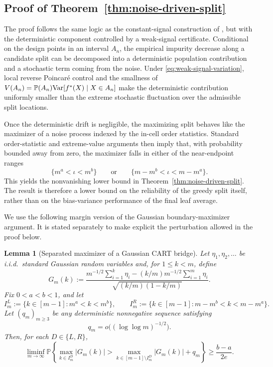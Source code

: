 \documentclass[11pt]{article}
\theoremstyle{plain}
\newtheorem{lemma}[theorem]{Lemma}
\theoremstyle{definition}
\theoremstyle{remark}
\theoremstyle{plain}
\renewcommand{\P}{\mathbb{P}}
\newcommand{\Var}{\textnormal{Var}}
\newcommand{\1}{\mathbbm{1}}
\begin{document}
\subsection{Proof of Theorem~\ref{thm:noise-driven-split}}

The proof follows the same logic as the constant-signal construction of \citet{cattaneo2025honest}, but with the deterministic component controlled by a weak-signal certificate. Conditional on the design points in an interval $A_n$, the empirical impurity decrease along a candidate split can be decomposed into a deterministic population contribution and a stochastic term coming from the noise. Under \eqref{eq:weak-signal-variation}, local reverse Poincar\'e control and the smallness of $V(A_n)=\P(A_n)\Var[f^*(X)\mid X\in A_n]$ make the deterministic contribution uniformly smaller than the extreme stochastic fluctuation over the admissible split locations.

Once the deterministic drift is negligible, the maximizing split behaves like the maximizer of a noise process indexed by the in-cell order statistics. Standard order-statistic and extreme-value arguments then imply that, with probability bounded away from zero, the maximizer falls in either of the near-endpoint ranges
\[
\{m^a<\iota<m^b\}
\qquad\text{or}\qquad
\{m-m^b<\iota<m-m^a\}.
\]
This yields the nonvanishing lower bound in Theorem~\ref{thm:noise-driven-split}. The result is therefore a lower bound on the reliability of the greedy split itself, rather than on the bias-variance performance of the final leaf average.

We use the following margin version of the Gaussian boundary-maximizer
argument. It is stated separately to make explicit the perturbation
allowed in the proof below.

\begin{lemma}[Separated maximizer of a Gaussian CART bridge]
\label{lem:separated-gaussian-cart-bridge}
Let $\eta_1,\eta_2,\ldots$ be i.i.d.\ standard Gaussian random
variables and, for $1\le k<m$, define
\[
    G_m(k)
    :=
    \frac{
        m^{-1/2}\sum_{i=1}^k\eta_i
        -
        (k/m)m^{-1/2}\sum_{i=1}^m\eta_i
    }{
        \sqrt{(k/m)(1-k/m)}
    }.
\]
Fix $0<a<b<1$, and let
\[
    I_m^L
    :=
    \{k\in[m-1]:m^a<k<m^b\},
    \qquad
    I_m^R
    :=
    \{k\in[m-1]:m-m^b<k<m-m^a\}.
\]
Let $(q_m)_{m\ge3}$ be any deterministic nonnegative sequence
satisfying
\[
    q_m
    =
    o\bigl((\log\log m)^{-1/2}\bigr).
\]
Then, for each $D\in\{L,R\}$,
\begin{equation}
\label{eq:separated-gaussian-cart-bridge}
    \liminf_{m\to\infty}
    \P
    \left\{
        \max_{k\in I_m^D}|G_m(k)|
        >
        \max_{k\in[m-1]\setminus I_m^D}|G_m(k)|
        +
        q_m
    \right\}
    \ge
    \frac{b-a}{2e}.
\end{equation}
\end{lemma}
\end{document}
